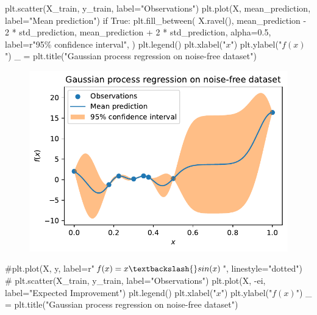 \documentclass[
  letterpaper,
  DIV=11,
  numbers=noendperiod]{scrreprt}
\newenvironment{Shaded}{\begin{snugshade}}{\end{snugshade}}
\newcommand{\CommentTok}[1]{\textcolor[rgb]{0.37,0.37,0.37}{#1}}
\newcommand{\ControlFlowTok}[1]{\textcolor[rgb]{0.00,0.23,0.31}{#1}}
\newcommand{\DecValTok}[1]{\textcolor[rgb]{0.68,0.00,0.00}{#1}}
\newcommand{\FloatTok}[1]{\textcolor[rgb]{0.68,0.00,0.00}{#1}}
\newcommand{\NormalTok}[1]{\textcolor[rgb]{0.00,0.23,0.31}{#1}}
\newcommand{\OperatorTok}[1]{\textcolor[rgb]{0.37,0.37,0.37}{#1}}
\newcommand{\SpecialCharTok}[1]{\textcolor[rgb]{0.37,0.37,0.37}{#1}}
\newcommand{\StringTok}[1]{\textcolor[rgb]{0.13,0.47,0.30}{#1}}
\newcommand{\VariableTok}[1]{\textcolor[rgb]{0.07,0.07,0.07}{#1}}
\newcommand{\VerbatimStringTok}[1]{\textcolor[rgb]{0.13,0.47,0.30}{#1}}
\begin{document}
\begin{Shaded}
\begin{Highlighting}[]
\NormalTok{plt.scatter(X\_train, y\_train, label}\OperatorTok{=}\StringTok{"Observations"}\NormalTok{)}
\NormalTok{plt.plot(X, mean\_prediction, label}\OperatorTok{=}\StringTok{"Mean prediction"}\NormalTok{)}
\ControlFlowTok{if} \VariableTok{True}\NormalTok{:}
\NormalTok{    plt.fill\_between(}
\NormalTok{        X.ravel(),}
\NormalTok{        mean\_prediction }\OperatorTok{{-}} \DecValTok{2} \OperatorTok{*}\NormalTok{ std\_prediction,}
\NormalTok{        mean\_prediction }\OperatorTok{+} \DecValTok{2} \OperatorTok{*}\NormalTok{ std\_prediction,}
\NormalTok{        alpha}\OperatorTok{=}\FloatTok{0.5}\NormalTok{,}
\NormalTok{        label}\OperatorTok{=}\VerbatimStringTok{r"95}\SpecialCharTok{\% c}\VerbatimStringTok{onfidence interval"}\NormalTok{,}
\NormalTok{    )}
\NormalTok{plt.legend()}
\NormalTok{plt.xlabel(}\StringTok{"$x$"}\NormalTok{)}
\NormalTok{plt.ylabel(}\StringTok{"$f(x)$"}\NormalTok{)}
\NormalTok{\_ }\OperatorTok{=}\NormalTok{ plt.title(}\StringTok{"Gaussian process regression on noise{-}free dataset"}\NormalTok{)}
\end{Highlighting}
\end{Shaded}

\begin{figure}[H]

{\centering \includegraphics{07_spot_ei_files/figure-pdf/cell-48-output-1.pdf}

}

\end{figure}

\begin{Shaded}
\begin{Highlighting}[]
\CommentTok{\#plt.plot(X, y, label=r"$f(x) = x \textbackslash{}sin(x)$", linestyle="dotted")}
\CommentTok{\# plt.scatter(X\_train, y\_train, label="Observations")}
\NormalTok{plt.plot(X, }\OperatorTok{{-}}\NormalTok{ei, label}\OperatorTok{=}\StringTok{"Expected Improvement"}\NormalTok{)}
\NormalTok{plt.legend()}
\NormalTok{plt.xlabel(}\StringTok{"$x$"}\NormalTok{)}
\NormalTok{plt.ylabel(}\StringTok{"$f(x)$"}\NormalTok{)}
\NormalTok{\_ }\OperatorTok{=}\NormalTok{ plt.title(}\StringTok{"Gaussian process regression on noise{-}free dataset"}\NormalTok{)}
\end{Highlighting}
\end{Shaded}
\end{document}
